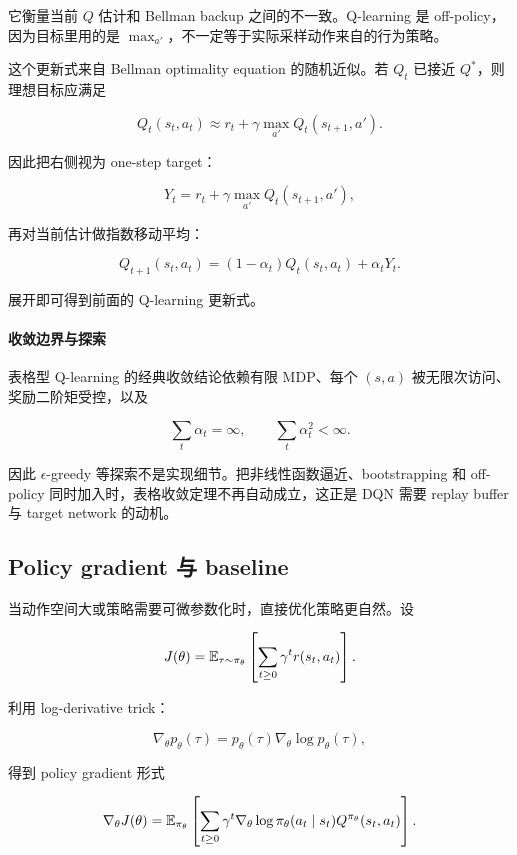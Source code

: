 \documentclass[11pt]{ctexart}
\begin{document}
它衡量当前 \(Q\) 估计和 Bellman backup 之间的不一致。Q-learning 是 off-policy，因为目标里用的是 \(\max_{a'}\)，不一定等于实际采样动作来自的行为策略。

这个更新式来自 Bellman optimality equation 的随机近似。若 \(Q_t\) 已接近 \(Q^*\)，则理想目标应满足

\[
  Q_t(s_t,a_t)
  \approx
  r_t+\gamma\max_{a'}Q_t(s_{t+1},a').
\]

因此把右侧视为 one-step target：

\[
  Y_t=r_t+\gamma\max_{a'}Q_t(s_{t+1},a'),
\]

再对当前估计做指数移动平均：

\[
  Q_{t+1}(s_t,a_t)
  =
  (1-\alpha_t)Q_t(s_t,a_t)+\alpha_tY_t.
\]

展开即可得到前面的 Q-learning 更新式。

\paragraph{收敛边界与探索}

表格型 Q-learning 的经典收敛结论依赖有限 MDP、每个 \((s,a)\) 被无限次访问、奖励二阶矩受控，以及

\[
  \sum_t\alpha_t=\infty,
  \qquad
  \sum_t\alpha_t^2<\infty.
\]

因此 \(\epsilon\)-greedy 等探索不是实现细节。把非线性函数逼近、bootstrapping 和 off-policy 同时加入时，表格收敛定理不再自动成立，这正是 DQN 需要 replay buffer 与 target network 的动机。

\subsection{Policy gradient 与 baseline}


当动作空间大或策略需要可微参数化时，直接优化策略更自然。设

\[
  J(\theta)=\mathbb{E}_{\tau\sim\pi_\theta}\left[\sum_{t\ge0}\gamma^t r(s_t,a_t)\right].
\]

利用 log-derivative trick：

\[
  \nabla_\theta p_\theta(\tau)
  =
  p_\theta(\tau)\nabla_\theta\log p_\theta(\tau),
\]

得到 policy gradient 形式

\[
  \nabla_\theta J(\theta)
  =
  \mathbb{E}_{\pi_\theta}
  \left[
    \sum_{t\ge0}
    \gamma^t
    \nabla_\theta\log\pi_\theta(a_t\mid s_t)
    Q^{\pi_\theta}(s_t,a_t)
  \right].
\]
\end{document}

